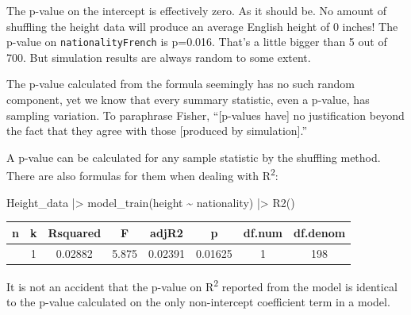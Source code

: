 \documentclass[
  letterpaper,
  DIV=11,
  numbers=noendperiod,
  oneside]{scrartcl}
\newenvironment{Shaded}{\begin{snugshade}}{\end{snugshade}}
\newcommand{\FunctionTok}[1]{\textcolor[rgb]{0.28,0.35,0.67}{#1}}
\newcommand{\NormalTok}[1]{\textcolor[rgb]{0.00,0.23,0.31}{#1}}
\newcommand{\SpecialCharTok}[1]{\textcolor[rgb]{0.37,0.37,0.37}{#1}}
\begin{document}
The p-value on the intercept is effectively zero. As it should be. No
amount of shuffling the height data will produce an average English
height of 0 inches! The p-value on \texttt{nationalityFrench} is
p=0.016. That's a little bigger than 5 out of 700. But simulation
results are always random to some extent.

The p-value calculated from the formula seemingly has no such random
component, yet we know that every summary statistic, even a p-value, has
sampling variation. To paraphrase Fisher, ``{[}p-values have{]} no
justification beyond the fact that they agree with those {[}produced by
simulation{]}.''

A p-value can be calculated for any sample statistic by the shuffling
method. There are also formulas for them when dealing with
R\textsuperscript{2}:

\begin{Shaded}
\begin{Highlighting}[]
\NormalTok{Height\_data }\SpecialCharTok{|\textgreater{}} 
  \FunctionTok{model\_train}\NormalTok{(height }\SpecialCharTok{\textasciitilde{}}\NormalTok{ nationality) }\SpecialCharTok{|\textgreater{}}
  \FunctionTok{R2}\NormalTok{()}
\end{Highlighting}
\end{Shaded}

\begin{longtable}[]{@{}cccccccc@{}}
\toprule\noalign{}
n & k & Rsquared & F & adjR2 & p & df.num & df.denom \\
\midrule\noalign{}
\endhead
\bottomrule\noalign{}
\endlastfoot
200 & 1 & 0.02882 & 5.875 & 0.02391 & 0.01625 & 1 & 198 \\
\end{longtable}

It is not an accident that the p-value on R\textsuperscript{2} reported
from the model is identical to the p-value calculated on the only
non-intercept coefficient term in a model.
\end{document}

